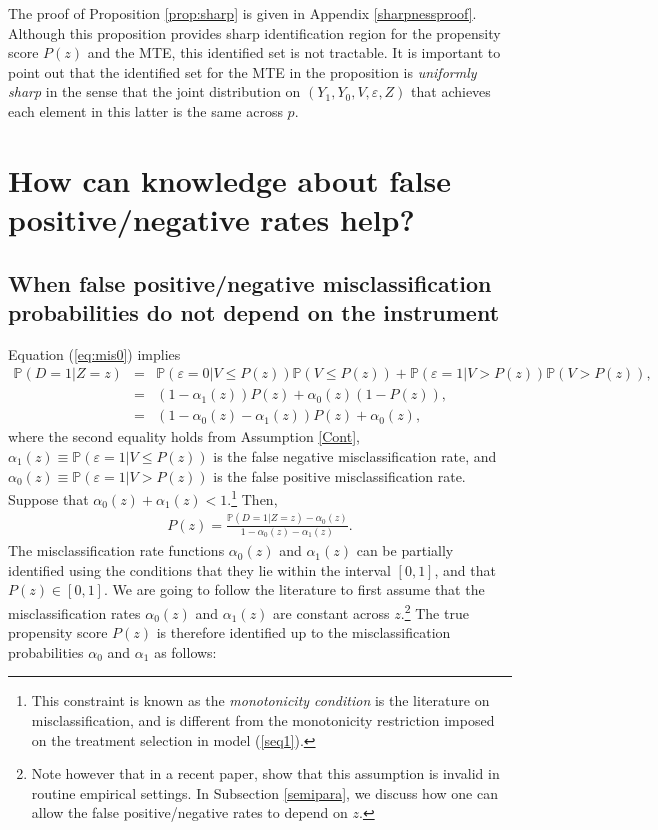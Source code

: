 \documentclass[11pt,reqno]{amsart}
\theoremstyle{plain}
\numberwithin{equation}{section}
\begin{document}
The proof of Proposition \ref{prop:sharp} is given in Appendix \ref{sharpnessproof}. Although this proposition provides sharp identification region for the propensity score $P(z)$ and the MTE, this identified set is not tractable. It is important to point out that the identified set for the MTE in the proposition is \textit{uniformly sharp} in the sense that the joint distribution on $(Y_1,Y_0,V,\varepsilon,Z)$ that achieves each element in this latter is the same across $p$. 

\section{How can knowledge about false positive/negative rates help?}\label{falserates}
\subsection{When false positive/negative misclassification probabilities do not depend on the instrument}\label{specialcase}
Equation (\ref{eq:mis0}) implies
\begin{eqnarray*}
\mathbb P(D=1\vert Z=z) &=& \mathbb P(\varepsilon=0\vert V \leq P(z))\mathbb P(V\leq P(z)) + \mathbb P(\varepsilon=1\vert V > P(z))\mathbb P(V > P(z)),\\
&=& (1-\alpha_1(z)) P(z) +\alpha_0(z) (1-P(z)),\\
&=& (1-\alpha_0(z)-\alpha_1(z)) P(z) + \alpha_0(z),
\end{eqnarray*}
where the second equality holds from Assumption \ref{Cont}, $\alpha_1(z)\equiv \mathbb P(\varepsilon=1\vert V \leq P(z))$ is the false negative misclassification rate, and $\alpha_0(z)\equiv \mathbb P(\varepsilon=1\vert V > P(z))$ is the false positive misclassification rate. Suppose that $\alpha_0(z)+\alpha_1(z) < 1$.\footnote{This constraint is known as the \textit{monotonicity condition} is the literature on misclassification, and is different from the monotonicity restriction imposed on the treatment selection in model (\ref{seq1}).} Then,
\begin{eqnarray*}
P(z)= \frac{\mathbb P(D=1\vert Z=z)-\alpha_0(z)}{1-\alpha_0(z)-\alpha_1(z)}.
\end{eqnarray*}
The misclassification rate functions $\alpha_0(z)$ and $\alpha_1(z)$ can be partially identified using the conditions that they lie within the interval $[0,1]$, and that $P(z)\in[0,1]$. We are going to follow the literature \citep{Hausman_al1998} to first assume that the misclassification rates $\alpha_0(z)$ and $\alpha_1(z)$ are constant across $z$.\footnote{Note however that in a recent paper, \cite{HaiderStephens2020} show that this assumption is invalid in routine empirical settings. In Subsection \ref{semipara}, we discuss how one can allow the false positive/negative rates to depend on $z$.} The true propensity score $P(z)$ is therefore identified up to the misclassification probabilities $\alpha_0$ and $\alpha_1$ as follows:
\end{document}
